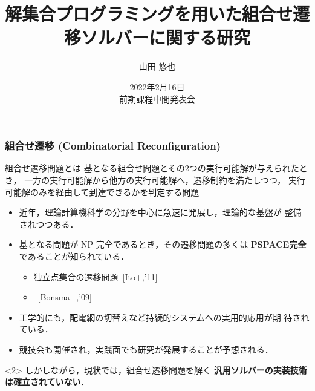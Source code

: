 \documentclass[dvipdfmx,11pt]{beamer}
\title{解集合プログラミングを用いた組合せ遷移ソルバーに関する研究}
\author{山田 悠也}
\date{2022年2月16日\\前期課程中間発表会}
\institute{番原研究室}
\begin{document}
\maketitle
\begin{frame}
  \frametitle{組合せ遷移 (Combinatorial Reconfiguration)}
  \begin{alertblock}{組合せ遷移問題とは}
    基となる組合せ問題とその2つの実行可能解が与えられたとき，
    一方の実行可能解から他方の実行可能解へ，遷移制約を満たしつつ，
    実行可能解のみを経由して到達できるかを判定する問題
  \end{alertblock}

  \begin{itemize}
  \item 近年，理論計算機科学の分野を中心に急速に発展し，理論的な基盤が
    整備されつつある\footnotemark[1]．
  \item 基となる問題が NP 完全であるとき，その遷移問題の多くは
    \alert{\bf PSPACE完全}であることが知られている．
    \begin{itemize}
    \item 独立点集合の遷移問題~[Ito+,'11]
    \item {}~[Bonsma+,'09]
    \end{itemize}
  \item 工学的にも，配電網の切替えなど持続的システムへの実用的応用が期
    待されている．
  \item 競技会も開催され，実践面でも研究が発展することが予想される．
  \end{itemize}

  \begin{alertblock}<2>{}\centering
    しかしながら，現状では，組合せ遷移問題を解く
    \alert{\bf 汎用ソルバーの実装技術は確立されていない}．
  \end{alertblock}

\end{frame}
\end{document}
